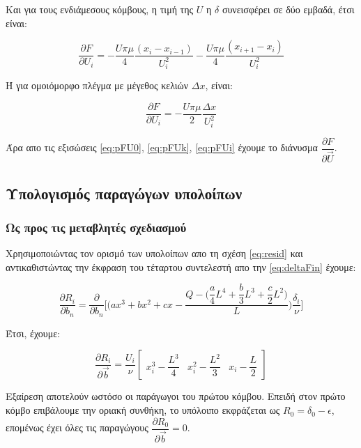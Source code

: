 Και για τους ενδιάμεσους κόμβους, η τιμή της $U$ η $\delta$ συνεισφέρει σε δύο εμβαδά, έτσι είναι:

\begin{equation}
    \dfrac{\partial F}{\partial U_i} = -\dfrac{U\pi\mu}{4}\dfrac{(x_i-x_{i-1})}{U_i^2}-\dfrac{U\pi\mu}{4}\dfrac{(x_{i+1}-x_i)}{U_i^2}
    \label{eq:pFUi}
\end{equation}

Ή για ομοιόμορφο πλέγμα με μέγεθος κελιών $\Delta x$, είναι:

\[
\dfrac{\partial F}{\partial U_i} = -\dfrac{U\pi\mu}{2}\dfrac{\Delta x}{U_i^2}
\]    


Άρα απο τις εξισώσεις \ref{eq:pFU0}, \ref{eq:pFUk}, \ref{eq:pFUi} έχουμε το διάνυσμα $\dfrac{\partial F}{\partial \vec{U}}$. 

\subsection{Υπολογισμός παραγώγων υπολοίπων}

\subsubsection{Ως προς τις μεταβλητές σχεδιασμού}

Χρησιμοποιώντας τον ορισμό των υπολοίπων απο τη σχέση \ref{eq:resid} και αντικαθιστώντας την έκφραση του τέταρτου συντελεστή απο την \ref{eq:deltaFin} έχουμε:

\begin{equation}
    \dfrac{\partial R_i}{\partial b_n} = \dfrac{\partial}{\partial b_n} \Bigg[\Big(ax^3+bx^2+cx-\dfrac{Q - \big(\dfrac{a}{4}L^4 + \dfrac{b}{3}L^3 + \dfrac{c}{2}L^2 \big)}{L}\Big)\dfrac{\delta_i}{\nu} \Bigg]
    \label{eq:pRb}
\end{equation}

Έτσι, έχουμε:

\begin{equation}
    \dfrac{\partial R_i}{\partial \vec{b}} = \dfrac{U_i}{\nu}
    \begin{bmatrix}
        x_i^3 - \dfrac{L^3}{4} & x_i^2 - \dfrac{L^2}{3} & x_i - \dfrac{L}{2}
    \end{bmatrix}
    \label{eq:finpRb}
\end{equation}

\vspace{10pt}
Εξαίρεση αποτελούν ωστόσο οι παράγωγοι του πρώτου κόμβου. Επειδή στον πρώτο κόμβο επιβάλουμε την οριακή συνθήκη, το υπόλοιπο εκφράζεται ως $R_0 = \delta_0 - \epsilon$, επομένως έχει όλες τις παραγώγους $\dfrac{\partial R_0}{\partial \vec{b}} = 0$. 


